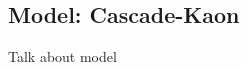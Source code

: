 \documentclass[../AnalysisNoteJBuxton.tex]{subfiles}
\begin{document}
\subsection{Model: Cascade-Kaon}
\label{ModelCascadeKaon}

Talk about model
\end{document}
